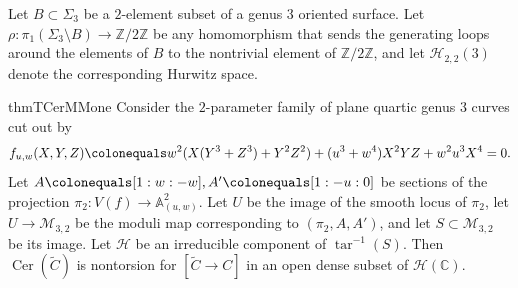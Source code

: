 \documentclass[reqno,10pt]{amsart}
\theoremstyle{definition}
\theoremstyle{definition}
\def\C{{\mathbb C}}
\def\Z{{\mathbb Z}}
\def\C{{\mathbb C}}
\DeclareMathOperator{\tar}{tar}
\newcommand{\Cer}{\operatorname{Cer}}
\begin{document}
Let $B \subset \Sigma_3$ be a $2$-element subset of a genus $3$ oriented surface. Let $\rho \colon \pi_1(\Sigma_3 \setminus B) \rightarrow \Z/2\Z$ be any homomorphism that sends the generating loops around the elements of $B$ to the nontrivial element of $\Z/2\Z$, and let $\mathcal{H}_{2,2}(3)$ denote the corresponding Hurwitz space. 

 \newcommand{\thmcermmpream}{Consider the $2$-parameter family of plane quartic genus $3$ curves cut out by 
\[ f_{u,w}(X,Y,Z) \colonequals w^2(X(Y^3+Z^3)+Y^2Z^2)+(u^3+w^4)X^2YZ+w^2u^3X^4=0. \]
Let $A \colonequals [1:w:-w], A' \colonequals [1:-u:0]$ be sections of the projection $\pi_2 \colon V(f) \rightarrow \mathbb{A}^2_{(u,w)}$. Let $U$ be the image of the smooth locus of $\pi_2$, let $U \rightarrow \mathcal{M}_{3,2}$ be the moduli map corresponding to $(\pi_2,A,A')$, and let $S \subset \mathcal{M}_{3,2}$ be its image.  Let $\mathcal{H}$ be an irreducible component of $\tar^{-1}(S)$. }

\begin{restatable}{thm}{TCerMMone} \label{T:CerMM1} 
   \thmcermmpream %
   Then $\Cer(\widetilde{C})$ is nontorsion for $[\widetilde{C} \rightarrow C]$ in an open dense subset of $\mathcal{H}(\C)$.
\end{restatable}
\end{document}
